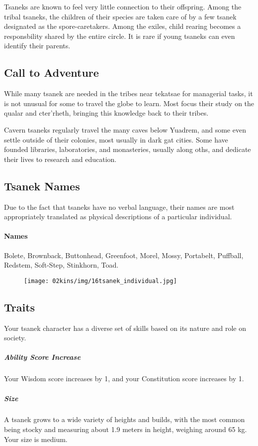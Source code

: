 \begin{linenumbers}
Tsaneks are known to feel very little connection to their offspring.
Among the tribal tsaneks, the children of their species are taken care of by a few tsanek designated as the spore-caretakers.
Among the exiles, child rearing becomes a responsbility shared by the entire circle.
It is rare if young tsaneks can even identify their parents.

\subsection*{Call to Adventure}
While many tsanek are needed in the tribes near tekatsae for managerial tasks, it is not unusual for some to travel the globe to learn.
Most focus their study on the qualar and cter'rheth, bringing this knowledge back to their tribes.

Cavern tsaneks regularly travel the many caves below Yuadrem, and some even settle outside of their colonies, most usually in dark gat cities.
Some have founded libraries, laboratories, and monasteries, usually along oths, and dedicate their lives to research and education.

\subsection*{Tsanek Names}
Due to the fact that tsaneks have no verbal language, their names are most appropriately translated as physical descriptions of a particular individual.

\paragraph{Names} Bolete, Brownback, Buttonhead, Greenfoot, Morel, Mossy, Portabelt, Puffball, Redstem, Soft-Step, Stinkhorn, Toad.

\begin{figure}[!t]
    \centering
    \texttt{[image: 02kins/img/16tsanek\_individual.jpg]}
\end{figure}

\subsection*{Traits}
Your tsanek character has a diverse set of skills based on its nature and role on society.

\subparagraph{Ability Score Increase} Your Wisdom score increases by 1, and your Constitution score increases by 1.

\subparagraph{Size} A tsanek grows to a wide variety of heights and builds, with the most common being stocky and measuring about 1.9 meters in height, weighing around 65 kg.
Your size is medium.


\end{linenumbers}
